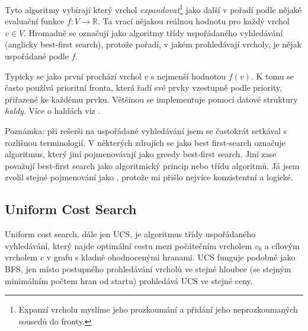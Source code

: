 \documentclass[12pt]{report}			%
\begin{document}
			
			Tyto algoritmy vybírají který vrchol \emph{expandovat}\footnote{Expanzí vrcholu myslíme jeho prozkoumání a přidání jeho neprozkoumaných sousedů do fronty.} jako další v pořadí podle nějaké evaluační funkce $f : V \rightarrow \mathbb{R}$. Ta vrací nějakou reálnou hodnotu pro každý vrchol $v \in V$. 
			Hromadně se označují jako algoritmy třídy uspořádaného vyhledávání (anglicky best-first search), protože pořadí, v jakém prohledávají vrcholy, je nějak uspořádané podle $f$.

			Typicky se jako první prochází vrchol $v$ s nejmenší hodnotou $f(v)$. K tomu se často používá prioritní fronta, která řadí své prvky vzestupně podle priority, přiřazené ke každému prvku. Většinou se implementuje pomocí datové struktury \emph{haldy}. Více o haldách viz \cite{pruvodce}.			
			
			Poznámka: při rešerši na uspořádané vyhledávání jsem se častokrát setkával s rozlišnou terminologií. V některých zdrojích \cite{carlos} se jako best first-search označuje algoritmus, který jiní \cite{patel_intro} pojmenovávají jako greedy best-first search. Jiní \cite{uhlik,wiki_best_first,felner} zase považují best-first search jako algoritmický princip nebo třídu algoritmů.
			 Já jsem zvolil stejné pojmenování jako \cite{patel_intro, uhlik, felner}, protože mi přišlo nejvíce konzistentní a logické.
			
			
			

			\subsection{Uniform Cost Search}
			Uniform cost search, dále jen UCS, je algoritmus třídy uspořádaného vyhledávání, který najde optimální %
			cestu mezi počátečním vrcholem $v_0$ a cílovým vrcholem $c$ v grafu s kladně ohodnocenými hranami. 
			UCS funguje podobně jako BFS, jen místo postupného prohledávání vrcholů ve stejné hloubce (se stejným minimálním počtem hran od startu) prohledává UCS ve  stejné ceny.
			
\end{document}
